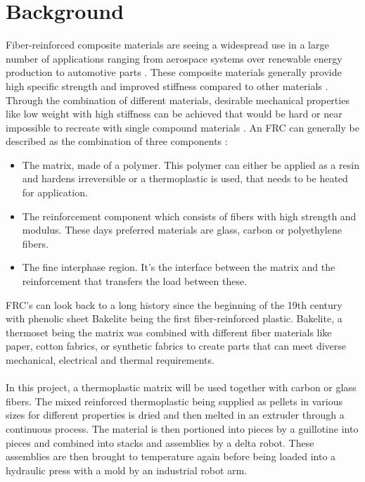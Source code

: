 \chapter{Background}

Fiber-reinforced composite materials are seeing a widespread use in a large number of applications ranging from aerospace systems over renewable energy production to automotive parts \cite{park2011interface} \cite{HighPerformanceTextiles}. These composite materials generally provide high specific strength and improved stiffness compared to other materials \cite{GeneralizedContinuumMechanics}. Through the combination of different materials, desirable mechanical properties like low weight with high stiffness can be achieved that would be hard or near impossible to recreate with single compound materials \cite{AdvancesDamageMechanics}. An FRC can generally be described as the combination of three components \cite{AdvancedDentalBiomaterials}: \\
\begin{itemize}
	\item The matrix, made of a polymer. This polymer can either be applied as a resin and hardens irreversible or a thermoplastic is used, that needs to be heated for application.
	\item The reinforcement component which consists of fibers with high strength and modulus. These days preferred materials are glass, carbon or polyethylene fibers.
	\item The fine interphase region. It's the interface between the matrix and the reinforcement that transfers the load between these.	
\end{itemize}
%
FRC's can look back to a long history since the beginning of the 19th century with phenolic sheet Bakelite being the first fiber-reinforced plastic. Bakelite, a thermoset being the matrix was combined with different fiber materials like paper, cotton fabrics, or synthetic fabrics to create parts that can meet diverse mechanical, electrical and thermal requirements.\cite{BakelitePhenolics}\\
\\
In this project, a thermoplastic matrix will be used together with carbon or glass fibers. The mixed reinforced thermoplastic being supplied as pellets in various sizes for different properties is dried and then melted in an extruder through a continuous process. The material is then portioned into pieces by a guillotine into pieces and combined into stacks and assemblies by a delta robot. These assemblies are then brought to temperature again before being loaded into a hydraulic press with a mold by an industrial robot arm.\cite{SystemRequirements}





